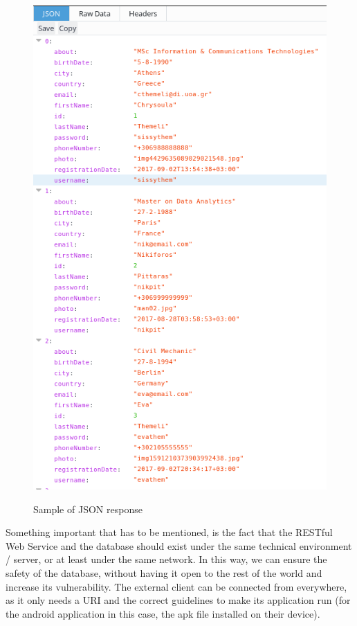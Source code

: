 \documentclass[12pt]{article}
\begin{document}
	\begin{figure} [H]
		\begin{center}
			\includegraphics [scale = 0.35] {json.png}\\[1.0 cm]
			\caption{Sample of JSON response}
		\end{center}
	\end{figure}
	
	
	Something important that has to be mentioned, is the fact that the RESTful Web Service and the database should exist under the same technical environment / server, or at least under the same network. In this way, we can ensure the safety of the database, without having it open to the rest of the world and increase its vulnerability. The external client can be connected from everywhere, as it only needs a URI and the correct guidelines to make its application run (for the android application in this case, the apk file installed on their device).
	
\end{document}
